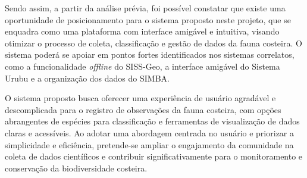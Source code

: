 Sendo assim, a partir da análise prévia, foi possível constatar que existe uma oportunidade de posicionamento para o sistema proposto neste projeto, que se enquadra como uma plataforma com interface amigável e intuitiva, visando otimizar o processo de coleta, classificação e gestão de dados da fauna costeira. O sistema poderá se apoiar em pontos fortes identificados nos sistemas correlatos, como a funcionalidade \textit{offline} do SISS-Geo, a interface amigável do Sistema Urubu e a organização dos dados do SIMBA.

O sistema proposto busca oferecer uma experiência de usuário agradável e descomplicada para o registro de observações da fauna costeira, com opções abrangentes de espécies para classificação e ferramentas de visualização de dados claras e acessíveis. Ao adotar uma abordagem centrada no usuário e priorizar a simplicidade e eficiência, pretende-se ampliar o engajamento da comunidade na coleta de dados científicos e contribuir significativamente para o monitoramento e conservação da biodiversidade costeira.
